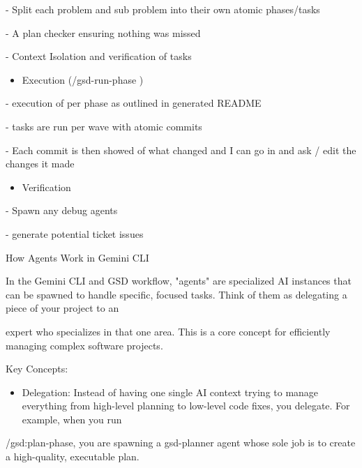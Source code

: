 \documentclass[
]{article}
\begin{document}
- Split each problem and sub problem into their own atomic phases/tasks

- A plan checker ensuring nothing was missed

- Context Isolation and verification of tasks

\begin{itemize}
\item
  Execution (/gsd-run-phase )
\end{itemize}

- execution of per phase as outlined in generated README

- tasks are run per wave with atomic commits

- Each commit is then showed of what changed and I can go in and ask /
edit the changes it made

\begin{itemize}
\item
  Verification
\end{itemize}

- Spawn any debug agents

- generate potential ticket issues

How Agents Work in Gemini CLI

In the Gemini CLI and GSD workflow, "agents" are specialized AI
instances that can be spawned to handle specific, focused tasks. Think
of them as delegating a piece of your project to an

expert who specializes in that one area. This is a core concept for
efficiently managing complex software projects.

Key Concepts:

\begin{itemize}
\item
  Delegation: Instead of having one single AI context trying to manage
  everything from high-level planning to low-level code fixes, you
  delegate. For example, when you run
\end{itemize}

/gsd:plan-phase, you are spawning a gsd-planner agent whose sole job is
to create a high-quality, executable plan.
\end{document}
